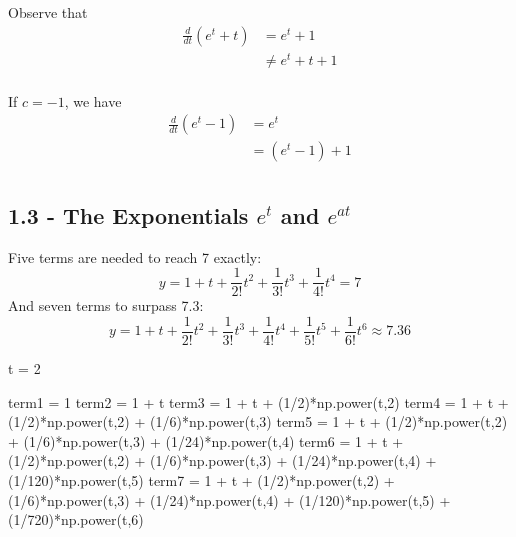 \documentclass[a4paper]{article}
\begin{document}
Observe that
\begin{align*}
	\frac{d }{d t} \!\left( e^{t} + t \right)   & = e^{t} + 1 \\
	 & \neq e^{t} + t + 1 \\ 
\end{align*}

If \(c = -1\), we have
\begin{align*}
	\frac{d }{d t} \!\left( e^{t} - 1 \right)   & = e^{t} \\
	 & = \!\left( e^{t} - 1 \right) + 1  \\ 
\end{align*}

\newpage
\subsection{\textsf{1.3 - The Exponentials \texorpdfstring{\(e^{t}\)}{e(t)} and \texorpdfstring{\(e^{at}\)}{exp(at)}}}


Five terms are needed to reach 7 exactly:
\[
	y = 1 + t + \frac{1}{2!}t^{2} + \frac{1}{3!}t^{3} + \frac{1}{4!}t^{4} = 7
\]
And seven terms to surpass 7.3:
\[
	y = 1 + t + \frac{1}{2!}t^{2} + \frac{1}{3!}t^{3} + \frac{1}{4!}t^{4} + \frac{1}{5!}t^{5} + \frac{1}{6!}t^{6} \approx 7.36
\]

\begin{python}
t = 2

term1 = 1
term2 = 1 + t
term3 = 1 + t + (1/2)*np.power(t,2)
term4 = 1 + t + (1/2)*np.power(t,2) + (1/6)*np.power(t,3)
term5 = 1 + t + (1/2)*np.power(t,2) + (1/6)*np.power(t,3) 
	+ (1/24)*np.power(t,4)
term6 = 1 + t + (1/2)*np.power(t,2) + (1/6)*np.power(t,3) 
	+ (1/24)*np.power(t,4) + (1/120)*np.power(t,5)
term7 = 1 + t + (1/2)*np.power(t,2) + (1/6)*np.power(t,3) 
	+ (1/24)*np.power(t,4) + (1/120)*np.power(t,5) 
	+ (1/720)*np.power(t,6)
\end{python}

\end{document}
